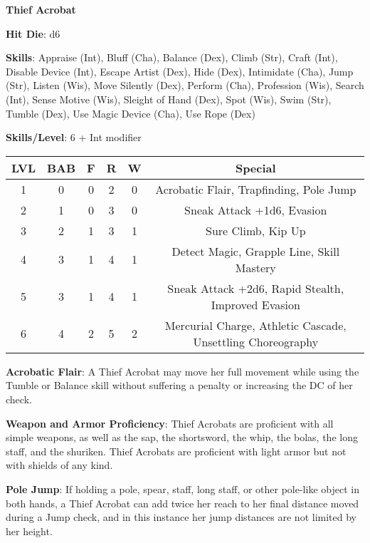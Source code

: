 \textbf{\huge{Thief Acrobat}}

\textbf{Hit Die}: d6

\textbf{Skills}: Appraise (Int), Bluff (Cha), Balance (Dex), Climb (Str), Craft (Int), Disable Device (Int), Escape Artist (Dex), Hide (Dex), Intimidate (Cha), Jump (Str), Listen (Wis), Move Silently (Dex), Perform (Cha), Profession (Wis), Search (Int), Sense Motive (Wis), Sleight of Hand (Dex), Spot (Wis), Swim (Str), Tumble (Dex), Use Magic Device (Cha), Use Rope (Dex)

\textbf{Skills/Level}: 6 + Int modifier

\begin{center}
\begin{adjustwidth}{-4cm}{}
\begin{small}
\begin{tabular}{| c | c | c | c | c | c |}
\hline
LVL &BAB &F &R &W &Special \\
\hline
1 &0 &0 &2 &0 &Acrobatic Flair, Trapfinding, Pole Jump \\
2 &1 &0 &3 &0 &Sneak Attack +1d6, Evasion \\
3 &2 &1 &3 &1 &Sure Climb, Kip Up \\
4 &3 &1 &4 &1 &Detect Magic, Grapple Line, Skill Mastery \\
5 &3 &1 &4 &1 &Sneak Attack +2d6, Rapid Stealth, Improved Evasion \\
6 &4 &2 &5 &2 &Mercurial Charge, Athletic Cascade, Unsettling Choreography \\
\hline
\end{tabular}
\end{small}
\end{adjustwidth}
\end{center}

\textbf{Acrobatic Flair}: A Thief Acrobat may move her full movement while using the Tumble or Balance skill without suffering a penalty or increasing the DC of her check.

\textbf{Weapon and Armor Proficiency}: Thief Acrobats are proficient with all simple weapons, as well as the sap, the shortsword, the whip, the bolas, the long staff, and the shuriken. Thief Acrobats are proficient with light armor but not with shields of any kind.

\textbf{Pole Jump}: If holding a pole, spear, staff, long staff, or other pole-like object in both hands, a Thief Acrobat can add twice her reach to her final distance moved during a Jump check, and in this instance her jump distances are not limited by her height.

